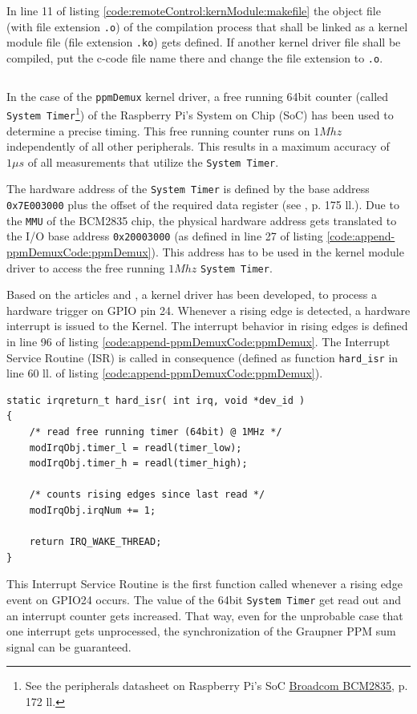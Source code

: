 In line 11 of listing \ref{code:remoteControl:kernModule:makefile} the object file (with file extension \texttt{.o}) of the compilation process that shall be linked as a kernel module file (file extension \texttt{.ko}) gets defined. If another kernel driver file shall be compiled, put the c-code file name there and change the file extension to \texttt{.o}.

\begin{lstlisting}[language=bash,caption={[Simple Makefile to compile a custom kernel driver]Simple Makefile to compile a custom kernel driver (here for the kernel module \texttt{ppmDemux})},label=code:remoteControl:kernModule:makefile,otherkeywords={ifeq,else,ifneq,endif,default,clean}]
\end{lstlisting}
In the case of the \texttt{ppmDemux} kernel driver, a free running 64bit counter (called \texttt{System Timer}\footnote{See the peripherals datasheet on Raspberry Pi's SoC \href{https://www.raspberrypi.org/documentation/hardware/raspberrypi/bcm2835/BCM2835-ARM-Peripherals.pdf}{Broadcom BCM2835}, p. 172 ll. }) of the Raspberry Pi's System on Chip (SoC) has been used to determine a precise timing. This free running counter runs on $1Mhz$ independently of all other peripherals. This results in a maximum accuracy of $1\mu s$ of all measurements that utilize the \texttt{System Timer}.

The hardware address of the \texttt{System Timer} is defined by the base address \texttt{0x7E003000} plus the offset of the required data register (see \cite{doc:bcm2835}, p. 175 ll.). Due to the \texttt{MMU} of the BCM2835 chip, the physical hardware address gets translated to the I/O base address \texttt{0x20003000} (as defined in line 27 of listing \ref{code:append-ppmDemuxCode:ppmDemux}). This address has to be used in the kernel module driver to access the free running $1Mhz$ \texttt{System Timer}.

Based on the articles \cite{doc:Kern70} and \cite{doc:Kern81}, a kernel driver has been developed, to process a hardware trigger on GPIO pin 24. Whenever a rising edge is detected, a hardware interrupt is issued to the Kernel. The interrupt behavior in rising edges is defined in line 96 of listing \ref{code:append-ppmDemuxCode:ppmDemux}. The Interrupt Service Routine (ISR) is called in consequence (defined as function \texttt{hard\_isr} in line 60 ll. of listing \ref{code:append-ppmDemuxCode:ppmDemux}). 
\begin{lstlisting}[firstnumber=60]
static irqreturn_t hard_isr( int irq, void *dev_id )
{
	/* read free running timer (64bit) @ 1MHz */
	modIrqObj.timer_l = readl(timer_low);
	modIrqObj.timer_h = readl(timer_high);

	/* counts rising edges since last read */
	modIrqObj.irqNum += 1;

	return IRQ_WAKE_THREAD;
}
\end{lstlisting}
This Interrupt Service Routine is the first function called whenever a rising edge event on GPIO24 occurs. The value of the 64bit \texttt{System Timer} get read out and an interrupt counter gets increased. That way, even for the unprobable case that one interrupt gets unprocessed, the synchronization of the Graupner PPM sum signal can be guaranteed.

